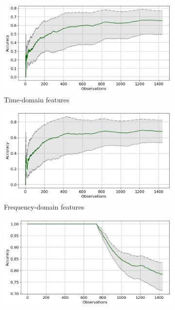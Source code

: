 \begin{figure}[h]
    \centering
    \begin{subfigure}[b]{0.48\textwidth}
        \includegraphics[width=\textwidth]{assets/results/incremental-learning/gradual-TD.png}
        \caption{Time-domain features}
    \end{subfigure}
    \hfill
    \begin{subfigure}[b]{0.48\textwidth}
        \includegraphics[width=\textwidth]{assets/results/incremental-learning/gradual-FD.png}
        \caption{Frequency-domain features}
    \end{subfigure}
    \hfill
    \begin{subfigure}[b]{0.48\textwidth}
        \includegraphics[width=\textwidth]{assets/results/incremental-learning/gradual-TD-severity.png}

\end{subfigure}
\end{figure}
